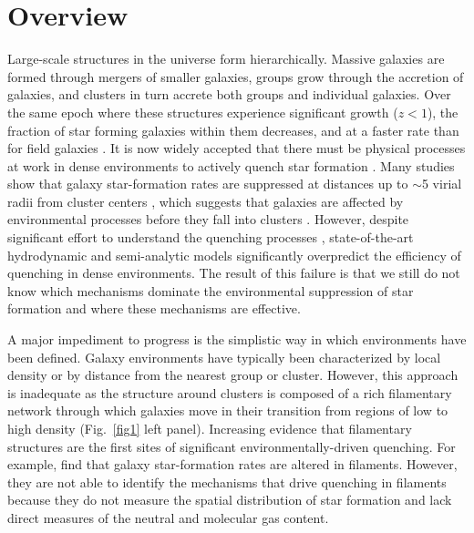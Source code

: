 \documentclass[11pt, preprint]{aastex}
\begin{document}
\section{Overview}
\vspace*{-.4cm}

Large-scale structures in the universe form hierarchically. Massive
galaxies are formed through mergers of smaller galaxies, groups grow
through the accretion of galaxies, and clusters in turn accrete both
groups and individual galaxies. Over the same epoch where these
structures experience significant growth ($z<1$), the fraction of star
forming galaxies within them decreases, and at a faster rate than for
field galaxies \citep{Saintonge08,Finn10}.  It is now widely accepted
that there must be physical processes at work in dense
environments to actively quench star formation
\citep[e.g.][]{Lewis02,Balogh04}.  Many studies show that galaxy star-formation rates are suppressed at distances up
to $\sim$5 virial radii from cluster centers \citep[see Fig.~\ref{fig1} right
panel; ][]{Lewis02,gomez03, bahe13}, which suggests that galaxies are
affected by environmental processes before they fall into clusters
\citep[e.g.][]{poggianti99,cortese06}.   However, despite 
significant effort to understand the quenching processes \citep[e.g.][]{Wetzel13},
state-of-the-art hydrodynamic \citep[e.g.][]{Dave11} and semi-analytic
\citep[e.g.][]{guo11a,Hirschmann14} models significantly overpredict
the efficiency of quenching in dense environments.  The result of this
failure is that we still do not know which mechanisms dominate the environmental
suppression of star formation and where these mechanisms are
effective.  


A major impediment to progress is the simplistic way in which
environments have been defined.  Galaxy environments have typically been
characterized by local density or by distance from the
nearest group or cluster.  However, this %
approach %
is inadequate as the structure around clusters is composed of a rich filamentary network through which
galaxies move in their transition from regions of low to high
density (Fig.~\ref{fig1} left panel).  
Increasing evidence that filamentary structures are the first
sites of significant environmentally-driven quenching.  For example, \citet{cybulski14} find that
  galaxy star-formation rates are altered in filaments.  However, they
  are not able to identify the mechanisms that drive quenching
  in filaments because they do not measure the spatial distribution of
 star formation and lack direct measures of the neutral and molecular gas content.
\end{document}
